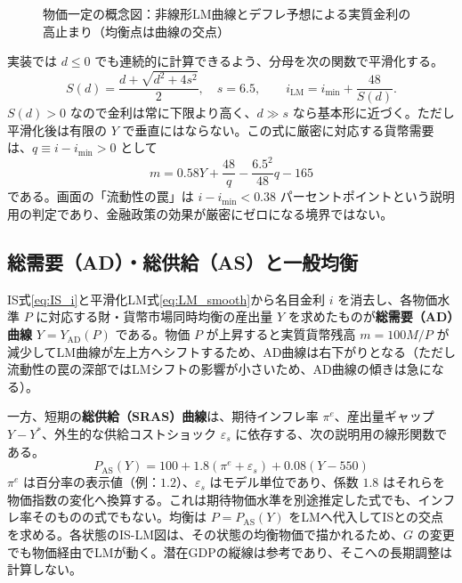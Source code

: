 \documentclass[lualatex,a4paper,11pt,ja=standard]{bxjsarticle}
\begin{document}
\begin{figure}[htbp]
\caption{物価一定の概念図：非線形LM曲線とデフレ予想による実質金利の高止まり（均衡点は曲線の交点）}
\label{fig:islm_concept}
\end{figure}

実装では $d \leq 0$ でも連続的に計算できるよう、分母を次の関数で平滑化する。
\begin{equation}
  S(d) = \frac{d + \sqrt{d^2+4s^2}}{2},\quad s=6.5,\qquad
  i_{\mathrm{LM}} = i_{\min} + \frac{48}{S(d)}.
  \label{eq:LM_smooth}
\end{equation}
$S(d)>0$ なので金利は常に下限より高く、$d \gg s$ なら基本形に近づく。ただし平滑化後は有限の $Y$ で垂直にはならない。この式に厳密に対応する貨幣需要は、$q\equiv i-i_{\min}>0$ として
\[
  m = 0.58Y + \frac{48}{q} - \frac{6.5^2}{48}q - 165
\]
である。画面の「流動性の罠」は $i-i_{\min}<0.38$ パーセントポイントという説明用の判定であり、金融政策の効果が厳密にゼロになる境界ではない。

\subsection{総需要（AD）・総供給（AS）と一般均衡}

IS式\eqref{eq:IS_i}と平滑化LM式\eqref{eq:LM_smooth}から名目金利 $i$ を消去し、各物価水準 $P$ に対応する財・貨幣市場同時均衡の産出量 $Y$ を求めたものが\textbf{総需要（AD）曲線} $Y = Y_{\mathrm{AD}}(P)$ である。物価 $P$ が上昇すると実質貨幣残高 $m = 100M/P$ が減少してLM曲線が左上方へシフトするため、AD曲線は右下がりとなる（ただし流動性の罠の深部ではLMシフトの影響が小さいため、AD曲線の傾きは急になる）。

一方、短期の\textbf{総供給（SRAS）曲線}は、期待インフレ率 $\pi^e$、産出量ギャップ $Y - Y^*$、外生的な供給コストショック $\varepsilon_s$ に依存する、次の説明用の線形関数である。
\begin{equation}
  P_{\mathrm{AS}}(Y) = 100 + 1.8(\pi^e + \varepsilon_s) + 0.08(Y - 550)
  \label{eq:AS}
\end{equation}
$\pi^e$ は百分率の表示値（例：$1.2$）、$\varepsilon_s$ はモデル単位であり、係数 $1.8$ はそれらを物価指数の変化へ換算する。これは期待物価水準を別途推定した式でも、インフレ率そのものの式でもない。均衡は $P=P_{\mathrm{AS}}(Y)$ をLMへ代入してISとの交点を求める。各状態のIS-LM図は、その状態の均衡物価で描かれるため、$G$ の変更でも物価経由でLMが動く。潜在GDPの縦線は参考であり、そこへの長期調整は計算しない。
\end{document}
